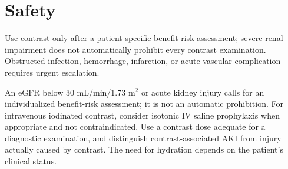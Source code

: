\section{Safety}
Use contrast only after a patient-specific benefit-risk assessment; severe renal impairment does not automatically prohibit every contrast examination. Obstructed infection, hemorrhage, infarction, or acute vascular complication requires urgent escalation.

\begin{pearlbox}
An eGFR below 30 mL/min/1.73 m$^2$ or acute kidney injury calls for an individualized benefit-risk assessment; it is not an automatic prohibition. For intravenous iodinated contrast, consider isotonic IV saline prophylaxis when appropriate and not contraindicated. Use a contrast dose adequate for a diagnostic examination, and distinguish contrast-associated AKI from injury actually caused by contrast. The need for hydration depends on the patient's clinical status.
\end{pearlbox}

\clearpage
